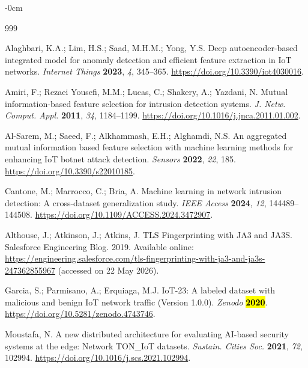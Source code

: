 \documentclass[futureinternet,article,accept,moreauthors]{Definitions/mdpi}
\begin{document}
\begin{adjustwidth}{-\extralength}{0cm}
\begin{thebibliography}{999}
  
  Alaghbari, K.A.; Lim, H.S.; Saad, M.H.M.; Yong, Y.S. Deep autoencoder-based integrated model for anomaly detection and efficient feature extraction in IoT networks. \emph{Internet Things} \textbf{2023}, \emph{4}, 345--365. \url{https://doi.org/10.3390/iot4030016}.

  
  Amiri, F.; Rezaei Yousefi, M.M.; Lucas, C.; Shakery, A.; Yazdani, N. Mutual information-based feature selection for intrusion detection systems. \emph{J. Netw. Comput. Appl.} \textbf{2011}, \emph{34}, 1184--1199. \url{https://doi.org/10.1016/j.jnca.2011.01.002}.

  
  Al-Sarem, M.; Saeed, F.; Alkhammash, E.H.; Alghamdi, N.S. An aggregated mutual information based feature selection with machine learning methods for enhancing IoT botnet attack detection. \emph{Sensors} \textbf{2022}, \emph{22}, 185. \url{https://doi.org/10.3390/s22010185}.

  
  Cantone, M.; Marrocco, C.; Bria, A. Machine learning in network intrusion detection: A cross-dataset generalization study. \emph{IEEE Access} \textbf{2024}, \emph{12}, 144489--144508. \url{https://doi.org/10.1109/ACCESS.2024.3472907}.

  
  Althouse, J.; Atkinson, J.; Atkins, J. TLS Fingerprinting with JA3 and JA3S. Salesforce Engineering Blog. 2019. Available online: \url{https://engineering.salesforce.com/tls-fingerprinting-with-ja3-and-ja3s-247362855967} (accessed on 22 May 2026).

  
  Garcia, S.; Parmisano, A.; Erquiaga, M.J. IoT-23: A labeled dataset with malicious and benign IoT network traffic (Version 1.0.0). \emph{Zenodo} \textbf{\hl{2020}}. \url{https://doi.org/10.5281/zenodo.4743746}.  %

  
  Moustafa, N. A new distributed architecture for evaluating AI-based security systems at the edge: Network TON\_IoT datasets. \emph{Sustain. Cities Soc.} \textbf{2021}, \emph{72}, 102994. \url{https://doi.org/10.1016/j.scs.2021.102994}.


\end{thebibliography}
\end{adjustwidth}
\end{document}
